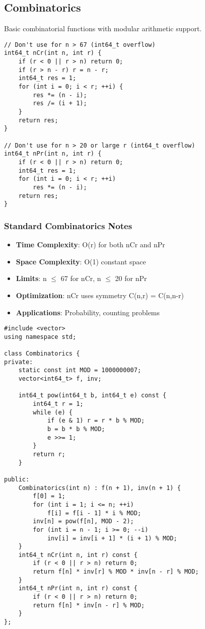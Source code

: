 \documentclass[11pt,a4paper]{article}
\begin{document}
\newpage
\subsection{Combinatorics}
Basic combinatorial functions with modular arithmetic support.

\begin{lstlisting}[caption={Standard nCr and nPr}]
// Don't use for n > 67 (int64_t overflow)
int64_t nCr(int n, int r) {
    if (r < 0 || r > n) return 0;
    if (r > n - r) r = n - r;
    int64_t res = 1;
    for (int i = 0; i < r; ++i) {
        res *= (n - i);
        res /= (i + 1);
    }
    return res;
}

// Don't use for n > 20 or large r (int64_t overflow)
int64_t nPr(int n, int r) {
    if (r < 0 || r > n) return 0;
    int64_t res = 1;
    for (int i = 0; i < r; ++i)
        res *= (n - i);
    return res;
}
\end{lstlisting}

\subsubsection*{Standard Combinatorics Notes}
\begin{itemize}
\item \textbf{Time Complexity}: O(r) for both nCr and nPr
\item \textbf{Space Complexity}: O(1) constant space
\item \textbf{Limits}: n $\leq$ 67 for nCr, n $\leq$ 20 for nPr
\item \textbf{Optimization}: nCr uses symmetry C(n,r) = C(n,n-r)
\item \textbf{Applications}: Probability, counting problems
\end{itemize}

\newpage
\begin{lstlisting}[caption={Combinatorics with Modular Arithmetic}]
#include <vector>
using namespace std;

class Combinatorics {
private:
    static const int MOD = 1000000007;
    vector<int64_t> f, inv;
    
    int64_t pow(int64_t b, int64_t e) const {
        int64_t r = 1;
        while (e) {
            if (e & 1) r = r * b % MOD;
            b = b * b % MOD;
            e >>= 1;
        }
        return r;
    }

public:
    Combinatorics(int n) : f(n + 1), inv(n + 1) {
        f[0] = 1;
        for (int i = 1; i <= n; ++i)
            f[i] = f[i - 1] * i % MOD;
        inv[n] = pow(f[n], MOD - 2);
        for (int i = n - 1; i >= 0; --i)
            inv[i] = inv[i + 1] * (i + 1) % MOD;
    }
    int64_t nCr(int n, int r) const {
        if (r < 0 || r > n) return 0;
        return f[n] * inv[r] % MOD * inv[n - r] % MOD;
    }
    int64_t nPr(int n, int r) const {
        if (r < 0 || r > n) return 0;
        return f[n] * inv[n - r] % MOD;
    }
};
\end{lstlisting}
\end{document}
